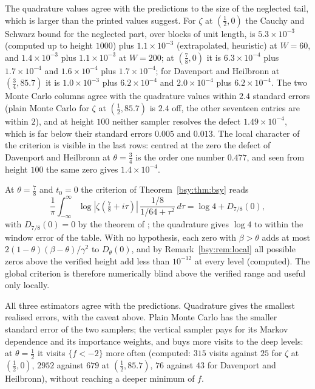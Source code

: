 The quadrature values agree with the predictions to the size of the neglected tail, which is larger than the printed values suggest. For $\zeta$ at $(\frac12,0)$ the Cauchy and Schwarz bound for the neglected part, over blocks of unit length, is $5.3\times10^{-3}$ (computed up to height $1000$) plus $1.1\times10^{-3}$ (extrapolated, heuristic) at $W=60$, and $1.4\times10^{-3}$ plus $1.1\times10^{-3}$ at $W=200$; at $(\frac78,0)$ it is $6.3\times10^{-4}$ plus $1.7\times10^{-4}$ and $1.6\times10^{-4}$ plus $1.7\times10^{-4}$; for Davenport and Heilbronn at $(\frac34,85.7)$ it is $1.0\times10^{-3}$ plus $6.2\times10^{-4}$ and $2.0\times10^{-4}$ plus $6.2\times10^{-4}$. The two Monte Carlo columns agree with the quadrature values within $2.4$ standard errors (plain Monte Carlo for $\zeta$ at $(\frac12,85.7)$ is $2.4$ off, the other seventeen entries are within $2$), and at height $100$ neither sampler resolves the defect $1.49\times10^{-4}$, which is far below their standard errors $0.005$ and $0.013$. The local character of the criterion is visible in the last rows: centred at the zero the defect of Davenport and Heilbronn at $\theta=\frac34$ is the order one number $0.477$, and seen from height $100$ the same zero gives $1.4\times10^{-4}$.

At $\theta=\frac78$ and $t_0=0$ the criterion of Theorem~\ref{bsy:thm:bsy} reads
\[
\frac1\pi\int_{-\infty}^{\infty}\log|\zeta(\tfrac78+i\tau)|\,\frac{1/8}{1/64+\tau^2}\,d\tau=\log4+D_{7/8}(0),
\]
with $D_{7/8}(0)=0$ by the theorem of \cite{OAI26a}; the quadrature gives $\log4$ to within the window error of the table. With no hypothesis, each zero with $\beta>\theta$ adds at most $2(1-\theta)(\beta-\theta)/\gamma^2$ to $D_\theta(0)$, and by Remark~\ref{bsy:rem:local} all possible zeros above the verified height add less than $10^{-12}$ at every level (computed). The global criterion is therefore numerically blind above the verified range and useful only locally.

All three estimators agree with the predictions. Quadrature gives the smallest realised errors, with the caveat above. Plain Monte Carlo has the smaller standard error of the two samplers; the vertical sampler pays for its Markov dependence and its importance weights, and buys more visits to the deep levels: at $\theta=\frac12$ it visits $\{f<-2\}$ more often (computed: $315$ visits against $25$ for $\zeta$ at $(\frac12,0)$, $2952$ against $679$ at $(\frac12,85.7)$, $76$ against $43$ for Davenport and Heilbronn), without reaching a deeper minimum of $f$.

